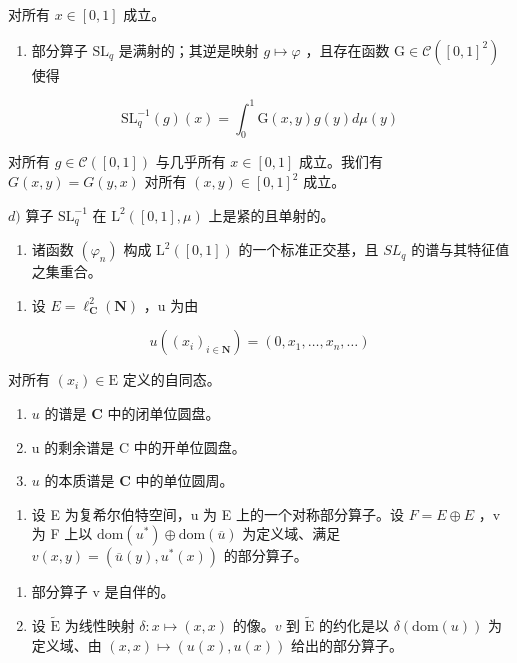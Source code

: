 对所有 \(x \in [0,1]\) 成立。

\begin{enumerate}
\def\labelenumi{\alph{enumi})}
\setcounter{enumi}{2}
\tightlist
\item
  部分算子 \(\mathrm{SL}_q\) 是满射的；其逆是映射 \(g\mapsto \varphi\) ，且存在函数 \(\mathrm{G}\in \mathcal{C}([0,1]^2)\) 使得
\end{enumerate}

\[
\mathrm{SL} _ {q} ^ {- 1} (g) (x) = \int_ {0} ^ {1} \mathrm{G} (x, y) g (y) d \mu (y)
\]

对所有 \(g \in \mathcal{C}([0,1])\) 与几乎所有 \(x \in [0,1]\) 成立。我们有 \(G(x,y) = G(y,x)\) 对所有 \((x,y) \in [0,1]^2\) 成立。

\(d)\) 算子 \(\mathrm{SL}_q^{-1}\) 在 \(\mathrm{L}^2 ([0,1],\mu)\) 上是紧的且单射的。

\begin{enumerate}
\def\labelenumi{\alph{enumi})}
\setcounter{enumi}{4}
\tightlist
\item
  诸函数 \((\varphi_{n})\) 构成 \(\mathrm{L}^{2}([0,1])\) 的一个标准正交基，且 \(SL_{q}\) 的谱与其特征值之集重合。
\end{enumerate}

\begin{enumerate}
\def\labelenumi{\arabic{enumi})}
\setcounter{enumi}{22}
\tightlist
\item
  设 \(E = \ell_{\mathbf{C}}^{2}(\mathbf{N})\) ，u 为由
\end{enumerate}

\[
u ((x _ {i}) _ {i \in \mathbf {N}}) = (0, x _ {1}, \dots , x _ {n}, \dots)
\]

对所有 \((x_{i})\in \mathrm{E}\) 定义的自同态。

\begin{enumerate}
\def\labelenumi{\alph{enumi})}
\item
  \(u\) 的谱是 \(\mathbf{C}\) 中的闭单位圆盘。
\item
  u 的剩余谱是 C 中的开单位圆盘。
\item
  \(u\) 的本质谱是 \(\mathbf{C}\) 中的单位圆周。
\end{enumerate}

\begin{enumerate}
\def\labelenumi{\arabic{enumi})}
\setcounter{enumi}{23}
\tightlist
\item
  设 E 为复希尔伯特空间，u 为 E 上的一个对称部分算子。设 \(F = E \oplus E\) ，v 为 F 上以 \(\text{dom}(u^{*}) \oplus \text{dom}(\overline{u})\) 为定义域、满足 \(v(x, y) = (\overline{u}(y), u^{*}(x))\) 的部分算子。
\end{enumerate}

\begin{enumerate}
\def\labelenumi{\alph{enumi})}
\item
  部分算子 v 是自伴的。
\item
  设 \(\widetilde{\mathrm{E}}\) 为线性映射 \(\delta\colon x\mapsto(x,x)\) 的像。\(v\) 到 \(\widetilde{\mathrm{E}}\) 的约化是以 \(\delta(\mathrm{dom}(u))\) 为定义域、由 \((x,x)\mapsto(u(x),u(x))\) 给出的部分算子。
\end{enumerate}

